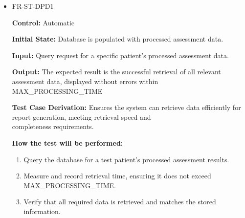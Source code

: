 \documentclass[12pt, titlepage]{article}
\begin{document}
\begin{itemize}
  \item FR-ST-DPD1
  \begin{mdframed}[linewidth=0.5mm]
      \textbf{Control:} Automatic \par
      \textbf{Initial State:} Database is populated with processed assessment data. \par
      \textbf{Input:} Query request for a specific patient’s processed assessment data. \par
      \textbf{Output:} The expected result is the successful retrieval of all relevant assessment data, displayed without errors within \\MAX\_PROCESSING\_TIME \par
      \textbf{Test Case Derivation:} Ensures the system can retrieve data efficiently for report generation, meeting retrieval speed and \\completeness requirements. \par
      \textbf{How the test will be performed:}
      \begin{enumerate}[noitemsep]
        \item Query the database for a test patient’s processed assessment results. 
        \item Measure and record retrieval time, ensuring it does not exceed MAX\_PROCESSING\_TIME. 
        \item Verify that all required data is retrieved and matches the stored information.
      \end{enumerate}
  \end{mdframed}


\end{itemize}
\end{document}
